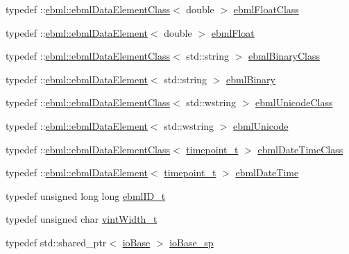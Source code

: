 \begin{DoxyCompactItemize}
\item 
typedef \+::\mbox{\hyperlink{classebml_1_1ebmlDataElementClass}{ebml\+::ebml\+Data\+Element\+Class}}$<$ double $>$ \mbox{\hyperlink{namespaceebml_a2e365f10ba5435bdd5c1fd909a601f31}{ebml\+Float\+Class}}
\item 
typedef \+::\mbox{\hyperlink{classebml_1_1ebmlDataElement}{ebml\+::ebml\+Data\+Element}}$<$ double $>$ \mbox{\hyperlink{namespaceebml_af998fa3b620e1bb7363e1426c9910b9c}{ebml\+Float}}
\item 
typedef \+::\mbox{\hyperlink{classebml_1_1ebmlDataElementClass}{ebml\+::ebml\+Data\+Element\+Class}}$<$ std\+::string $>$ \mbox{\hyperlink{namespaceebml_a4fe139b904ac34f0e3036c9451b4b18b}{ebml\+Binary\+Class}}
\item 
typedef \+::\mbox{\hyperlink{classebml_1_1ebmlDataElement}{ebml\+::ebml\+Data\+Element}}$<$ std\+::string $>$ \mbox{\hyperlink{namespaceebml_a9b2775bff9ce97bc09b955ca1de557ae}{ebml\+Binary}}
\item 
typedef \+::\mbox{\hyperlink{classebml_1_1ebmlDataElementClass}{ebml\+::ebml\+Data\+Element\+Class}}$<$ std\+::wstring $>$ \mbox{\hyperlink{namespaceebml_acdb74e752b77d5b4a4c445684db86832}{ebml\+Unicode\+Class}}
\item 
typedef \+::\mbox{\hyperlink{classebml_1_1ebmlDataElement}{ebml\+::ebml\+Data\+Element}}$<$ std\+::wstring $>$ \mbox{\hyperlink{namespaceebml_abd9662588801df32dd1d2853a9f2f9b1}{ebml\+Unicode}}
\item 
typedef \+::\mbox{\hyperlink{classebml_1_1ebmlDataElementClass}{ebml\+::ebml\+Data\+Element\+Class}}$<$ \mbox{\hyperlink{namespaceebml_a7e667ec3fe8b51fb5b8f9690734d8638}{timepoint\+\_\+t}} $>$ \mbox{\hyperlink{namespaceebml_afea0376d38786592ad3e71d619256ab5}{ebml\+Date\+Time\+Class}}
\item 
typedef \+::\mbox{\hyperlink{classebml_1_1ebmlDataElement}{ebml\+::ebml\+Data\+Element}}$<$ \mbox{\hyperlink{namespaceebml_a7e667ec3fe8b51fb5b8f9690734d8638}{timepoint\+\_\+t}} $>$ \mbox{\hyperlink{namespaceebml_a544c5c28e36511ffd20b5907e551754f}{ebml\+Date\+Time}}
\item 
typedef unsigned long long \mbox{\hyperlink{namespaceebml_a86c5f604ddf12a74aa9812e997a58691}{ebml\+I\+D\+\_\+t}}
\item 
typedef unsigned char \mbox{\hyperlink{namespaceebml_a2ccdfb60b23efb51fe07f9d066e23604}{vint\+Width\+\_\+t}}
\item 
typedef std\+::shared\+\_\+ptr$<$ \mbox{\hyperlink{classebml_1_1ioBase}{io\+Base}} $>$ \mbox{\hyperlink{namespaceebml_a7bb59128ac6af27e47367938a846b569}{io\+Base\+\_\+sp}}

\end{DoxyCompactItemize}
